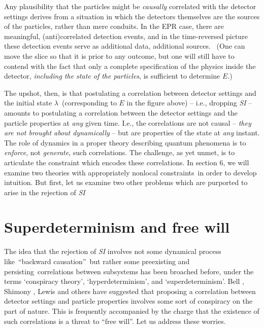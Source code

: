 \documentclass[12pt]{article}%
\begin{document}
Any plausibility that the particles might be \emph{causally }correlated with
the detector settings derives from a situation in which the detectors
themselves are the sources of the particles, rather than mere conduits. In the
EPR case, there are meaningful, (anti)correlated detection events, and in the
time-reversed picture these detection events serve as additional data,
additional sources. \ (One can move the slice so that it is prior to any
outcome, but one will still have to contend with the fact that only a complete
specification of the physics inside the detector, \emph{including the state of
the particles}, is sufficient to determine $E$.)

The upshot, then, is that postulating a correlation between detector settings
and the initial state $\lambda$\ (corresponding to $E$ in the figure above) --
i.e., dropping \emph{SI} -- amounts to postulating a correlation between the
detector settings and the particle properties at \emph{any} given time. I.e.,
the correlations are not causal -- \emph{they are not brought about
dynamically} -- but are properties of the state at \emph{any }instant. The
role of dynamics in a proper theory describing quantum phenomena is to
\emph{enforce}, not \emph{generate}, such correlations. The challenge, as yet
unmet, is to articulate the constraint which encodes these correlations. In
section 6, we will examine two theories with appropriately nonlocal
constraints\ in order to develop intuition. But first, let us examine two
other problems which are purported to arise in the rejection of \emph{SI}

\section{Superdeterminism and free will}

The idea that the rejection of \emph{SI} involves not some dynamical process
like\ \textquotedblleft backward causation\textquotedblright\ but rather some
preexisting and persisting\ correlations between subsystems has been broached
before, under the terms `conspiracy theory', `hyperdeterminism', and
`superdeterminism'. Bell \cite{Bel90b}, Shimony \cite{Shim85}, Lewis
\cite{LewP06} and others have suggested that proposing a correlation between
detector settings and particle properties involves some sort of conspiracy on
the part of nature. This is frequently accompanied by the charge that the
existence of such correlations is a threat to \textquotedblleft free
will\textquotedblright. Let us address these worries.
\end{document}
